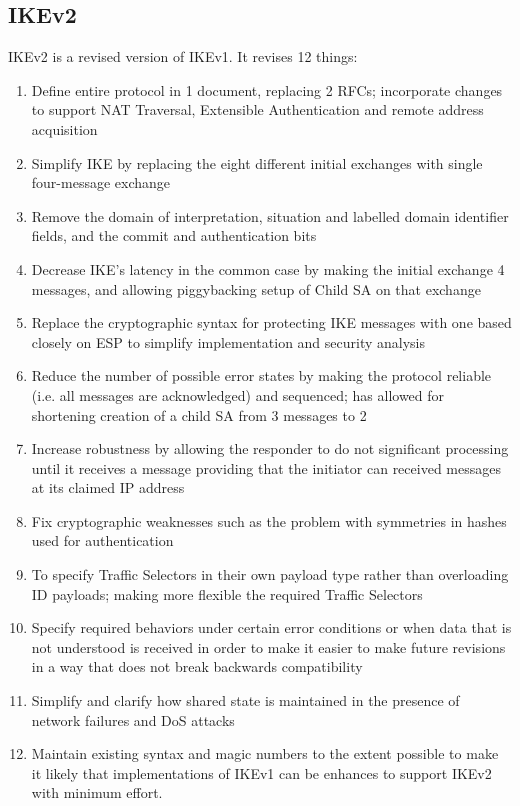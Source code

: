 \subsection{IKEv2}
IKEv2 is a revised version of IKEv1. It revises 12 things:
\begin{enumerate}
    \item Define entire protocol in 1 document, replacing 2 RFCs; incorporate changes to support NAT Traversal, Extensible Authentication and remote address acquisition
    \item Simplify IKE by replacing the eight different initial exchanges with single four-message exchange
    \item Remove the domain of interpretation, situation and labelled domain identifier fields, and the commit and authentication bits
    \item Decrease IKE's latency in the common case by making the initial exchange 4 messages, and allowing piggybacking setup of Child SA on that exchange
    \item Replace the cryptographic syntax for protecting IKE messages with one based closely on ESP to simplify implementation and security analysis
    \item Reduce the number of possible error states by making the protocol reliable (i.e. all messages are acknowledged) and sequenced; has allowed for shortening creation of a child SA from 3 messages to 2
    \item Increase robustness by allowing the responder to do not significant processing until it receives a message providing that the initiator can received messages at its claimed IP address
    \item Fix cryptographic weaknesses such as the problem with symmetries in hashes used for authentication
    \item To specify Traffic Selectors in their own payload type rather than overloading ID payloads; making more flexible the required Traffic Selectors
    \item Specify required behaviors under certain error conditions or when data that is not understood is received in order to make it easier to make future revisions in a way that does not break backwards compatibility
    \item Simplify and clarify how shared state is maintained in the presence of network failures and DoS attacks
    \item Maintain existing syntax and magic numbers to the extent possible to make it likely that implementations of IKEv1 can be enhances to support IKEv2 with minimum effort.
\end{enumerate}

